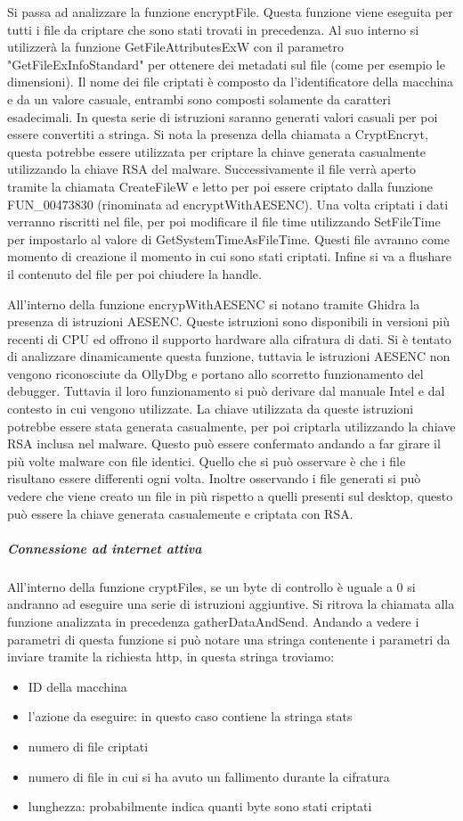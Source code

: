 \documentclass[a4paper,12pt]{article}
\begin{document}
Si passa ad analizzare la funzione encryptFile. Questa funzione viene eseguita per tutti i file da criptare che sono stati trovati in precedenza. Al suo interno si utilizzerà la funzione GetFileAttributesExW con il parametro "GetFileExInfoStandard" per ottenere dei metadati sul file (come per esempio le dimensioni).  Il nome dei file criptati è composto da l'identificatore della macchina e da un valore casuale, entrambi sono composti solamente da caratteri esadecimali. In questa serie di istruzioni saranno generati valori casuali per poi essere convertiti a stringa.
Si nota la presenza della chiamata a CryptEncryt, questa potrebbe essere utilizzata per criptare la chiave generata casualmente utilizzando la chiave RSA del malware.
Successivamente il file verrà aperto tramite la chiamata CreateFileW e letto per poi essere criptato dalla funzione FUN\_00473830 (rinominata ad encryptWithAESENC). Una volta criptati i dati verranno riscritti nel file, per poi modificare il file time utilizzando SetFileTime per impostarlo al valore di GetSystemTimeAsFileTime. Questi file avranno come momento di creazione il momento in cui sono stati criptati. Infine si va a flushare il contenuto del file per poi chiudere la handle. 

All'interno della funzione encrypWithAESENC si notano tramite Ghidra la presenza di istruzioni AESENC. Queste istruzioni sono disponibili in versioni più recenti di CPU ed offrono il supporto hardware alla cifratura di dati. Si è tentato di analizzare dinamicamente questa funzione, tuttavia le istruzioni AESENC non vengono riconosciute da OllyDbg e portano allo scorretto funzionamento del debugger. Tuttavia il loro funzionamento si può derivare dal manuale Intel e dal contesto in cui vengono utilizzate. La chiave utilizzata da queste istruzioni potrebbe essere stata generata casualmente, per poi criptarla utilizzando la chiave RSA inclusa nel malware. Questo può essere confermato andando a far girare il  più volte malware con file identici. Quello che si può osservare è che i file risultano essere differenti ogni volta. Inoltre osservando i file generati si può vedere che viene creato un file in più rispetto a quelli presenti sul desktop, questo può essere la chiave generata casualemente e criptata con RSA.
 
\subparagraph{Connessione ad internet attiva}
All'interno della funzione cryptFiles, se un byte di controllo è uguale a 0 si andranno ad eseguire una serie di istruzioni aggiuntive. Si ritrova la chiamata alla funzione analizzata in precedenza gatherDataAndSend. Andando a vedere i parametri di questa funzione si può notare una stringa contenente i parametri da inviare tramite la richiesta http, in questa stringa troviamo: \begin{itemize}
	\item ID della macchina
	\item l'azione da eseguire: in questo caso contiene la stringa stats
	\item numero di file criptati
	\item numero di file in cui si ha avuto un fallimento durante la cifratura
	\item lunghezza: probabilmente indica quanti byte sono stati criptati
\end{itemize} 
\end{document}
